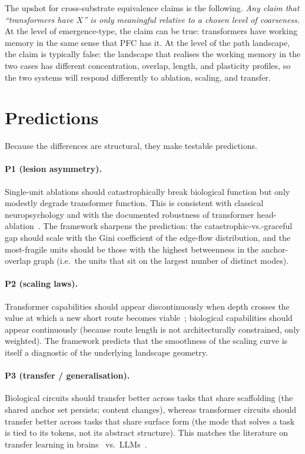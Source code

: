 \documentclass[11pt,a4paper]{article}
\begin{document}
The upshot for cross-substrate equivalence claims is the following.
\emph{Any claim that ``transformers have $X$'' is only meaningful
relative to a chosen level of coarseness.} At the level of
emergence-type, the claim can be true: transformers have working
memory in the same sense that PFC has it. At the level of the path
landscape, the claim is typically false: the landscape that realises
the working memory in the two cases has different concentration,
overlap, length, and plasticity profiles, so the two systems will
respond differently to ablation, scaling, and transfer.

\section{Predictions}\label{sec:predictions}

Because the differences are structural, they make testable predictions.

\paragraph{P1 (lesion asymmetry).} Single-unit ablations should
catastrophically break biological function but only modestly degrade
transformer function. This is consistent with classical
neuropsychology and with the documented robustness of transformer
head-ablation~\cite{voita2019heads,wang2022interpretability,mcgrath2023hydra}.
The framework sharpens the prediction: the catastrophic-vs.-graceful
gap should scale with the Gini coefficient of the edge-flow
distribution, and the most-fragile units should be those with the
highest betweenness in the anchor-overlap graph (i.e.\ the units that
sit on the largest number of distinct modes).

\paragraph{P2 (scaling laws).} Transformer capabilities should
appear discontinuously when depth crosses the value at which a new
short route becomes viable~\cite{wei2022emergent}; biological
capabilities should appear continuously (because route length is
not architecturally constrained, only weighted). The framework
predicts that the smoothness of the scaling curve is itself a
diagnostic of the underlying landscape geometry.

\paragraph{P3 (transfer / generalisation).} Biological circuits
should transfer better across tasks that share scaffolding (the
shared anchor set persists; content changes), whereas transformer
circuits should transfer better across tasks that share surface
form (the mode that solves a task is tied to its tokens, not its
abstract structure). This matches the literature on transfer
learning in
brains~\cite{taatgen2013nature,jolly2020flexible} vs.\
LLMs~\cite{mccoy2023embers}.
\end{document}
